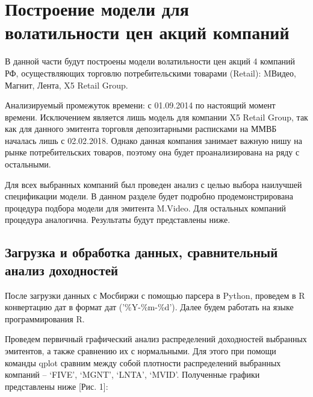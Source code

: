 \documentclass[a4paper,12pt,twoside]{article}
\begin{document}

\titleformat{\section}[block]{\normalfont\Large\centering}{\thesection}{1ex}{}
\section{Построение модели для волатильности цен акций компаний}\label{mgarch}

В данной части будут построены модели волатильности цен акций 4 компаний РФ, осуществляющих торговлю потребительскими товарами (Retail):
MВидео,
Магнит,
Лента,
X5 Retail Group.

Анализируемый промежуток времени: с 01.09.2014 по настоящий момент времени.
Исключением является лишь модель для компании X5 Retail Group, так как для данного эмитента торговля депозитарными расписками на ММВБ началась лишь с 02.02.2018.
Однако данная компания занимает важную нишу на рынке потребительских товаров, поэтому она будет проанализирована на ряду с остальными.

Для всех выбранных компаний был проведен анализ с целью выбора наилучшей спецификации модели.
В данном разделе будет подробно продемонстрирована процедура подбора модели для эмитента M.Video.
Для остальных компаний процедура аналогична.
Результаты будут представлены ниже.

\subsection{Загрузка и обработка данных, сравнительный анализ доходностей}

После загрузки данных с Мосбиржи с помощью парсера в Python, проведем в R конвертацию дат в формат дат ('\%Y-\%m-\%d').
Далее будем работать на языке программирования R.

Проведем первичный графический анализ распределений доходностей выбранных эмитентов, а также сравнению их с нормальными. Для этого при помощи команды qplot сравним между собой плотности распределений выбранных компаний – ‘FIVE’, ‘MGNT’, ‘LNTA’, ‘MVID’. Полученные графики представлены ниже [Рис. 1]:
\end{document}
